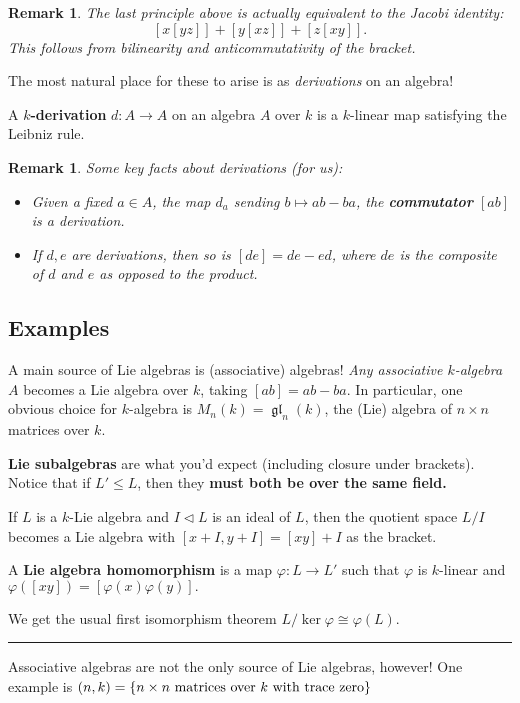 \documentclass[12pt]{article}
\theoremstyle{nonumberbreak}
\theoremstyle{changebreak}
\theoremstyle{nonumberbreak}
\theoremstyle{change}
\newtheorem{rmk}[thm]{Remark}
\newcommand*{\brk}{
\rule{2in}{.1pt}
}
\DeclareMathOperator{\gl}{\mathfrak{gl}}
\let\sl\relax
\DeclareMathOperator{\sl}{\mathfrak{sl}}
\begin{document}
\begin{rmk}
	The last principle above is actually equivalent to the \textit{Jacobi identity:}
	\[[x[yz]]+[y[xz]]+[z[xy]].\]
	This follows from bilinearity and anticommutativity of the bracket.
\end{rmk}
The most natural place for these to arise is as \textit{derivations} on an algebra!
\begin{defn}
	A \textbf{$k$-derivation} $d:A\to A$ on an algebra $A$ over $k$ is a $k$-linear map
	satisfying the Leibniz rule.
\end{defn}
\begin{rmk}
	Some key facts about derivations (for us):
	\begin{itemize}
		\item Given a fixed $a\in A$, the map $d_a$ sending $b\mapsto ab-ba$, the \textbf{commutator}
		$[ab]$ is a derivation.
		\item If $d,e$ are derivations, then so is $[de]=de-ed$, where $de$ is the \textit{composite}
		of $d$ and $e$ as opposed to the product.
	\end{itemize}
\end{rmk}

\subsection{Examples}

A main source of Lie algebras is (associative) algebras! \textit{Any associative $k$-algebra $A$}
becomes a Lie algebra over $k$, taking $[ab]=ab-ba.$ In particular, one obvious choice for $k$-algebra
is $M_n(k)=\gl_n(k)$, the (Lie) algebra of $n\times n$ matrices over $k$.

\textbf{Lie subalgebras} are what you'd expect (including closure under brackets). Notice
that if $L'\le L$, then they \textbf{must both be over the same field.}

If $L$ is a $k$-Lie algebra and $I\lhd L$ is an ideal of $L$, then the quotient space $L/I$ becomes a 
Lie algebra with $[x+I,y+I]=[xy]+I$ as the bracket.

A \textbf{Lie algebra homomorphism} is a map $\varphi:L\to L'$ such that $\varphi$ is $k$-linear
and $\varphi([xy])=[\varphi(x)\varphi(y)].$

We get the usual first isomorphism theorem $L/\ker\varphi\cong \varphi(L).$

\brk

Associative algebras are not the only source of Lie algebras, however! One example is 
$\sl(n,k)=\{n\times n\text{ matrices over } k\text{ with trace zero}\}$
\end{document}
